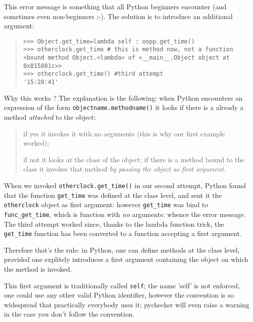 \documentclass[10pt,english]{article}
\begin{document}
This error message is something that all Python beginners encounter
(and sometimes even non-beginners ;-). The solution is to introduce
an additional argument:
\begin{quote}
\begin{verbatim}>>> Object.get_time=lambda self : oopp.get_time()
>>> otherclock.get_time # this is method now, not a function
<bound method Object.<lambda> of <__main__.Object object at 0x815881c>>
>>> otherclock.get_time() #third attempt
'15:28:41'\end{verbatim}
\end{quote}

Why this works ? The explanation is the following:
when Python encounters an expression of the form
\texttt{objectname.methodname()} it looks if there is a already a method 
\emph{attached} to the object:
\begin{quote}
\begin{list}{.}
{
\setlength{\rightmargin}{\leftmargin}
}
\item {} 
if yes it invokes it with no arguments 
(this is why our first example worked);

\item {} 
if not it looks at the class of the object; if there is a method 
bound to the class it invokes that method \emph{by passing the 
object as first argument}.

\end{list}
\end{quote}

When we invoked \texttt{otherclock.get{\_}time()} in our second attempt, Python
found that the function \texttt{get{\_}time} was defined at the class level, 
and sent it the \texttt{otherclock} object as first argument: however \texttt{get{\_}time} 
was bind to \texttt{func{\_}get{\_}time}, which is function with \emph{no} arguments: whence
the error message. The third attempt worked since, thanks to the 
lambda function trick, the \texttt{get{\_}time} function has been converted to
a function accepting a first argument.

Therefore that's the rule: in Python, one can define methods 
at the class level, provided one explitely introduces a first argument
containing the object on which the method is invoked.

This first argument is traditionally called \texttt{self}; the name 'self' is not
enforced, one could use any other valid Python identifier, however the
convention is so widespread that practically everybody uses it;
pychecker will even raise a warning in the case you don't follow the
convention.
\end{document}
